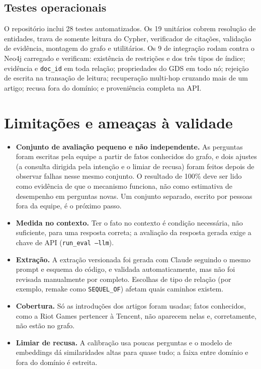 \documentclass[12pt]{article}
\begin{document}
\subsection{Testes operacionais}
O repositório inclui 28 testes automatizados. Os 19 unitários cobrem resolução de entidades, trava de somente leitura do Cypher, verificador de citações, validação de evidência, montagem do grafo e utilitários. Os 9 de integração rodam contra o Neo4j carregado e verificam: existência de restrições e dos três tipos de índice; evidência e \texttt{doc\_id} em toda relação; propriedades do GDS em todo nó; rejeição de escrita na transação de leitura; recuperação multi-hop cruzando mais de um artigo; recusa fora do domínio; e proveniência completa na API.

\section{Limitações e ameaças à validade}
\begin{itemize}\item \textbf{Conjunto de avaliação pequeno e não independente.} As perguntas foram escritas pela equipe a partir de fatos conhecidos do grafo, e dois ajustes (a consulta dirigida pela intenção e o limiar de recusa) foram feitos depois de observar falhas nesse mesmo conjunto. O resultado de 100\% deve ser lido como evidência de que o mecanismo funciona, não como estimativa de desempenho em perguntas novas. Um conjunto separado, escrito por pessoas fora da equipe, é o próximo passo.
\item \textbf{Medida no contexto.} Ter o fato no contexto é condição necessária, não suficiente, para uma resposta correta; a avaliação da resposta gerada exige a chave de API (\texttt{run\_eval --llm}).
\item \textbf{Extração.} A extração versionada foi gerada com Claude seguindo o mesmo prompt e esquema do código, e validada automaticamente, mas não foi revisada manualmente por completo. Escolhas de tipo de relação (por exemplo, remake como \texttt{SEQUEL\_OF}) afetam quais caminhos existem.
\item \textbf{Cobertura.} Só as introduções dos artigos foram usadas; fatos conhecidos, como a Riot Games pertencer à Tencent, não aparecem nelas e, corretamente, não estão no grafo.
\item \textbf{Limiar de recusa.} A calibração usa poucas perguntas e o modelo de embeddings dá similaridades altas para quase tudo; a faixa entre domínio e fora do domínio é estreita.
\end{itemize}
\end{document}
